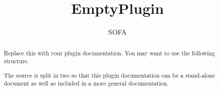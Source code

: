 \documentclass{article}
\begin{document}
\raggedright

\title{EmptyPlugin}
\author{SOFA}

\maketitle

\begin{abstract}
Replace this with your plugin documentation. You may want to use the following structure.

The source is split in two so that this plugin documentation can be a stand-alone document as well as included in a more general documentation.
\end{abstract}


\end{document}
